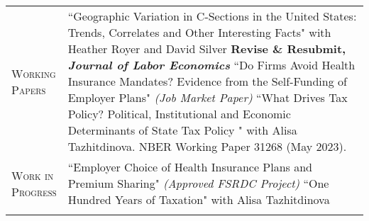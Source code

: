 \documentclass[11pt]{article}
\newcommand{\xspace}{19pt}
\begin{document}
\begin{tabularx}{\textwidth}{@{}Y Z@{}}
	\textsc{Working \newline Papers} & 
	``Geographic Variation in C-Sections in the United States: Trends, Correlates \newline and Other Interesting Facts" with Heather Royer and David Silver \newline \textbf{Revise \& Resubmit, \textit{Journal of Labor Economics}}
	\vspace{10pt} \newline
	``Do Firms Avoid Health Insurance Mandates? Evidence from the Self-Funding \newline of Employer Plans"  \textit{(Job Market Paper)}
	\vspace{10pt} \newline
	``What Drives Tax Policy? Political, Institutional and Economic Determinants of \newline State Tax Policy " with Alisa Tazhitdinova. NBER Working Paper 31268 (May 2023).
     \\ \addlinespace[\xspace] 
    
    \textsc{Work in \newline Progress}  & 
    ``Employer Choice of Health Insurance Plans and Premium Sharing"
    \newline \textit{(Approved FSRDC Project)}
    \vspace{10pt} \newline
    ``One Hundred Years of Taxation" with Alisa Tazhitdinova
     \\ \addlinespace[\xspace] 


\end{tabularx}
\end{document}
